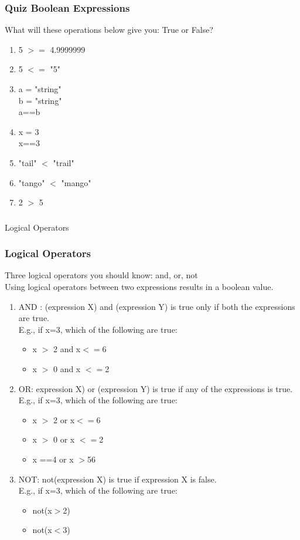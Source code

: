 \documentclass{beamer}
\begin{document}
\begin{frame}%
\frametitle{Quiz Boolean Expressions}
What will these operations below give you: True or False?
\begin{enumerate}
\item 5 $>=$ 4.9999999
\item 5 $<=$ "5"
\item a = "string" \\ b = "string" \\ a==b
\item x = 3 \\ x==3 
\item "tail" $<$ "trail"
\item "tango" $<$ "mango"
\item 2 $>$ 5
\end{enumerate}
\end{frame}


\begin{frame}
\frametitle{}
\begin{center}
Logical Operators
\end{center}
\end{frame}

\begin{frame}%
\frametitle{Logical Operators}
Three logical operators you should know: and, or, not
\\ Using logical operators between two expressions results in a boolean value.
\begin{enumerate}
\item AND : (expression X) and (expression Y) is true only if both the expressions are true.
\\ E.g., if x=3, which of the following are true:
\begin{itemize}
\item x $>$ 2 and x$<=$6
\item x $>$ 0 and x $<=$2
\end{itemize}\pause
\item OR: expression X) or (expression Y) is true if any of the expressions is true.
\\ E.g., if x=3, which of the following are true:
\begin{itemize}
\item x $>$ 2 or x$<=$6
\item x $>$ 0 or x $<=$2
\item x ==4 or x $>$56
\end{itemize}\pause
\item NOT: not(expression X) is true if expression X is false.
\\E.g., if x=3, which of the following are true:
\begin{itemize}
\item not(x$>$2)
\item not(x$<$3)
\end{itemize}
\end{enumerate}
\end{frame}
\end{document}
